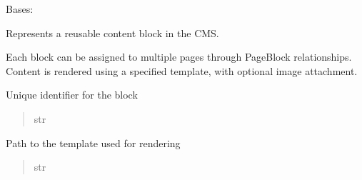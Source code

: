 \documentclass[letterpaper,10pt,english]{sphinxmanual}
\begin{document}
\begin{fulllineitems}
\label{\detokenize{pages_app.models:pages_app.models.Block}}
\pysigstartsignatures
\pysiglinewithargsret
{}
{\sphinxparamcomma {}}
{}
\pysigstopsignatures
\sphinxAtStartPar
Bases: {\hyperref[\detokenize{pages_app.models:pages_app.models.base.TimestampedModel}]{}}

\sphinxAtStartPar
Represents a reusable content block in the CMS.

\sphinxAtStartPar
Each block can be assigned to multiple pages through PageBlock relationships.
Content is rendered using a specified template, with optional image attachment.

\begin{fulllineitems}
\label{\detokenize{pages_app.models:pages_app.models.Block.name}}
\pysigstartsignatures
\pysigline
{}
\pysigstopsignatures
\sphinxAtStartPar
Unique identifier for the block
\begin{quote}\begin{description}
\sphinxAtStartPar
str

\end{description}\end{quote}

\end{fulllineitems}


\begin{fulllineitems}
\label{\detokenize{pages_app.models:pages_app.models.Block.template}}
\pysigstartsignatures
\pysigline
{}
\pysigstopsignatures
\sphinxAtStartPar
Path to the template used for rendering
\begin{quote}\begin{description}
\sphinxAtStartPar
str

\end{description}\end{quote}


\end{fulllineitems}
\end{fulllineitems}
\end{document}
